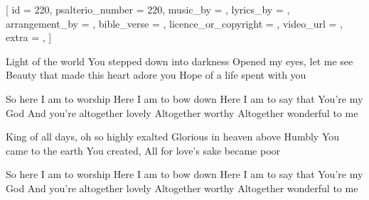 [
    id                     = {220},
    psalterio_number       = {220},
    music_by               = {},
    lyrics_by              = {},
    arrangement_by         = {},
    bible_verse            = {},
    licence_or_copyright   = {},
    video_url              = {},
    extra                  = {},
]


\beginverse
Light of the world
You stepped down into darkness
Opened my eyes, let me see
Beauty that made this heart adore you
Hope of a life spent with you
\endverse


\beginchorus
So here I am to worship
Here I am to bow down
Here I am to say that You're my God
And you're altogether lovely
Altogether worthy
Altogether wonderful to me
\endchorus


\beginverse
King of all days, oh so highly exalted
Glorious in heaven above
Humbly You came to the earth You created,
All for love's sake became poor

\endverse


\beginchorus
So here I am to worship
Here I am to bow down
Here I am to say that You're my God
And you're altogether lovely
Altogether worthy
Altogether wonderful to me
\endchorus

\endsong
